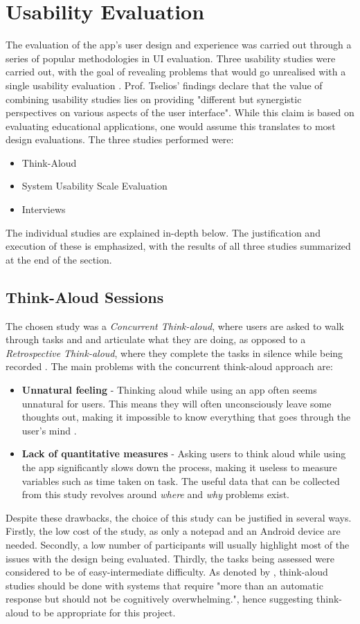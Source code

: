 \section{Usability Evaluation}
The evaluation of the app's user design and experience was carried out through a series of popular methodologies in UI evaluation. Three usability studies were carried out, with the goal of revealing problems that would go unrealised with a single usability evaluation \cite{article}. Prof. Tselios' findings declare that the value of combining usability studies lies on providing "different but synergistic perspectives on various aspects of the user interface". While this claim is based on evaluating educational applications, one would assume this translates to most design evaluations. The three studies performed were:
\begin{itemize}
    \item Think-Aloud
    \item System Usability Scale Evaluation
    \item Interviews
\end{itemize}
The individual studies are explained in-depth below. The justification and execution of these is emphasized, with the results of all three studies summarized at the end of the section.
\subsection{Think-Aloud Sessions}
The chosen study was a \emph{Concurrent Think-aloud}, where users are asked to walk through tasks and and articulate what they are doing, as opposed to a  \emph{Retrospective Think-aloud}, where they complete the tasks in silence while being recorded \cite{hanington2012universal}. The main problems with the concurrent think-aloud approach are:
\begin{itemize}
    \item \textbf{Unnatural feeling} - Thinking aloud while using an app often seems unnatural for users. This means they will often unconsciously leave some thoughts out, making it impossible to know everything that goes through the user's mind \cite{rubin1996handbook}.
    \item \textbf{Lack of quantitative measures} - Asking users to think aloud while using the app significantly slows down the process, making it useless to measure variables such as time taken on task. The useful data that can be collected from this study revolves around \emph{where} and \emph{why} problems exist.
\end{itemize}
Despite these drawbacks, the choice of this study can be justified in several ways. Firstly, the low cost of the study, as only a notepad and an Android device are needed. Secondly, a low number of participants will usually highlight most of the issues with the design being evaluated. Thirdly, the tasks being assessed were considered to be of easy-intermediate difficulty. As denoted by \cite{charters2003use}, think-aloud studies should be done with systems that require "more than an automatic response but should not be cognitively overwhelming.", hence suggesting think-aloud to be appropriate for this project.

